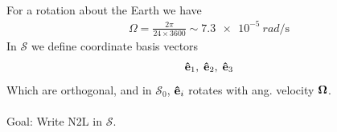 \documentclass[../main.tex]{subfiles}
\begin{document}
\paragraph*{} For a rotation about the Earth we have
\begin{align*}
    \Omega = \frac{2\pi}{24 \times 3600} \sim \qty{7.3e-5}{rad\per\s}
\end{align*}
In $\mathcal{S}$ we define coordinate basis vectors
\begin{align*}
    \vu e_1,\; \vu e_2,\; \vu e_3
\end{align*}
Which are orthogonal, and in $\mathcal{S}_0$, $\vu e_i$ rotates with ang. velocity $\vb \Omega$.

\paragraph*{} Goal: Write N2L in $\mathcal{S}$.
\end{document}
